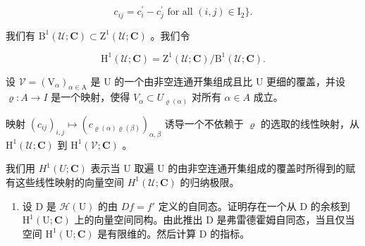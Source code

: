 \[
c _ {i j} = c _ {i} ^ {\prime} - c _ {j} ^ {\prime} \text {   for all   } (i, j) \in \mathrm{I} _ {2} \}.
\]

我们有 \(\mathrm{B}^1 (\mathcal{U};\mathbf{C})\subset \mathrm{Z}^1 (\mathcal{U};\mathbf{C})\) 。我们令

\[
\mathrm{H} ^ {1} (\mathcal {U}; \mathbf {C}) = \mathrm{Z} ^ {1} (\mathcal {U}; \mathbf {C}) / \mathrm{B} ^ {1} (\mathcal {U}; \mathbf {C}).
\]

设 \(\mathcal{V}=(\mathrm{V}_{\alpha})_{\alpha\in\mathrm{A}}\) 是 U 的一个由非空连通开集组成且比 U 更细的覆盖，并设 \(\varrho\colon A\to I\) 是一个映射，使得 \(V_{\alpha}\subset U_{\varrho(\alpha)}\) 对所有 \(\alpha\in A\) 成立。

映射 \((c_{ij})_{i,j} \mapsto (c_{\varrho(\alpha)\varrho(\beta)})_{\alpha,\beta}\) 诱导一个不依赖于 \(\varrho\) 的选取的线性映射，从 \(\mathrm{H}^1(\mathcal{U};\mathbf{C})\) 到 \(\mathrm{H}^1(\mathcal{V};\mathbf{C})\) 。

我们用 \(H^{1}(U; \mathbf{C})\) 表示当 U 取遍 U 的由非空连通开集组成的覆盖时所得到的赋有这些线性映射的向量空间 \(H^{1}(\mathcal{U}; \mathbf{C})\) 的归纳极限。

\begin{enumerate}
\def\labelenumi{\alph{enumi})}
\setcounter{enumi}{2}
\tightlist
\item
  设 D 是 \(\mathcal{H}(\mathrm{U})\) 的由 \(Df = f'\) 定义的自同态。证明存在一个从 D 的余核到 \(\mathrm{H}^1 (\mathrm{U};\mathbf{C})\) 上的向量空间同构。由此推出 D 是弗雷德霍姆自同态，当且仅当空间 \(\mathrm{H}^1 (\mathrm{U};\mathbf{C})\) 是有限维的。然后计算 D 的指标。
\end{enumerate}

